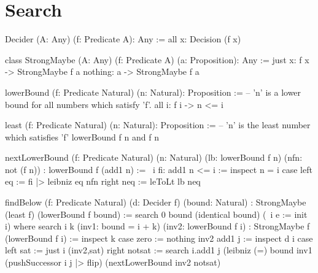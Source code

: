 \vskip 5mm
\section{Search}

\begin{alba}
    Decider (A: Any) (f: Predicate A): Any :=
        all x: Decision (f x)

    class StrongMaybe (A: Any) (f: Predicate A) (a: Proposition): Any :=
        just x: f x -> StrongMaybe f a
        nothing: a -> StrongMaybe f a

    lowerBound (f: Predicate Natural) (n: Natural): Proposition :=
            -- 'n' is a lower bound for all numbers which satisfy 'f'.
        all i: f i -> n <= i

    least (f: Predicate Natural) (n: Natural): Proposition :=
            -- 'n' is the least number which satisfies 'f'
        lowerBound f n and f n

    nextLowerBound
        (f: Predicate Natural) (n: Natural)
        (lb: lowerBound f n) (nfn: not (f n))
        : lowerBound f (add1 n)
    :=
        \ i fi: add1 n <= i :=
            inspect n = i case
                left eq :=
                    fi |> leibniz eq nfn
                right neq :=
                    leToLt lb neq

    findBelow
        (f: Predicate Natural)
        (d: Decider f)
        (bound: Natural)
        : StrongMaybe (least f) (lowerBound f bound)
    :=
        search 0 bound (identical bound) (\ i e := init i)
        where
            search
                i k
                (inv1: bound = i + k)
                (inv2: lowerBound f i)
                : StrongMaybe f (lowerBound f i)
            :=
                inspect k case
                    zero :=
                        nothing inv2
                    add1 j :=
                        inspect d i case
                            left sat :=
                                just i (inv2,sat)
                            right notsat :=
                                search
                                    i.add1
                                    j
                                    (leibniz
                                        {(=) bound}
                                        inv1
                                        (pushSuccessor {i} {j} |> flip)
                                    (nextLowerBound inv2 notsat)
\end{alba}


